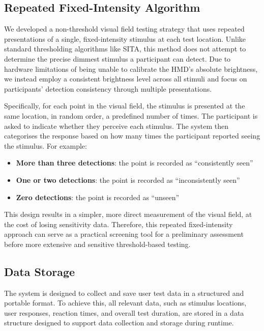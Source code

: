 \documentclass{l4proj}
\begin{document}
\subsection{Repeated Fixed-Intensity Algorithm}
\label{sec:RFIA}
We developed a non-threshold visual field testing strategy that uses repeated presentations of a single, fixed-intensity stimulus at each test location. Unlike standard thresholding algorithms like SITA, this method does not attempt to determine the precise dimmest stimulus a participant can detect. Due to hardware limitations of being unable to calibrate the HMD’s absolute brightness, we instead employ a consistent brightness level across all stimuli and focus on participants’ detection consistency through multiple presentations.  

Specifically, for each point in the visual field, the stimulus is presented at the same location, in random order, a predefined number of times. The participant is asked to indicate whether they perceive each stimulus. The system then categorises the response based on how many times the participant reported seeing the stimulus. For example: 

\begin{itemize}
    \item \textbf{More than three detections}: the point is recorded as “consistently seen”

    \item \textbf{One or two detections}: the point is recorded as “inconsistently seen”

    \item \textbf{Zero detections}: the point is recorded as “unseen”
\end{itemize}

This design results in a simpler, more direct measurement of the visual field, at the cost of losing sensitivity data. Therefore, this repeated fixed-intensity approach can serve as a practical screening tool for a preliminary assessment before more extensive and sensitive threshold-based testing. 

\subsection{Data Storage}
The system is designed to collect and save user test data in a structured and portable format. To achieve this, all relevant data, such as stimulus locations, user responses, reaction times, and overall test duration, are stored in a data structure designed to support data collection and storage during runtime. 
\end{document}
